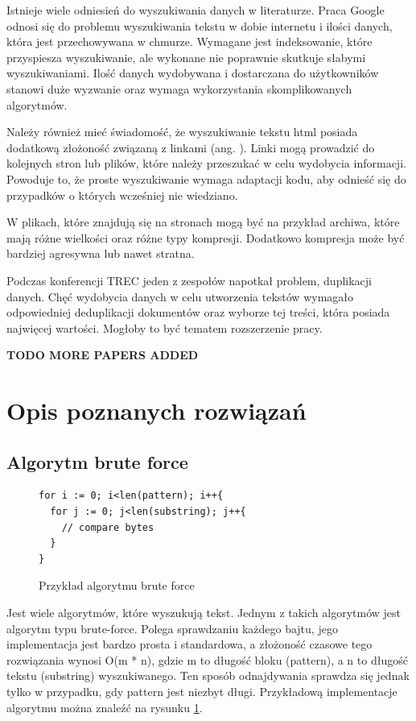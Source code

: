 Istnieje wiele odniesień do wyszukiwania danych w literaturze. Praca Google 
\cite{bib:internet:htmlSearchGoogle} odnosi się do problemu wyszukiwania tekstu 
w dobie internetu i ilości danych, która jest przechowywana w chmurze. Wymagane
jest indeksowanie, które przyspiesza wyszukiwanie, ale wykonane nie poprawnie 
skutkuje słabymi wyszukiwaniami. Ilość danych wydobywana i dostarczana do
użytkowników stanowi duże wyzwanie oraz wymaga wykorzystania skomplikowanych 
algorytmów. 

Należy również mieć świadomość, że wyszukiwanie tekstu html posiada dodatkową 
złożoność związaną z linkami (ang. ). Linki mogą prowadzić do 
kolejnych stron lub plików, które należy przeszukać w celu wydobycia informacji.
Powoduje to, że proste wyszukiwanie wymaga adaptacji kodu, aby odnieść się do 
przypadków o których wcześniej nie wiedziano.

W plikach, które znajdują się na stronach mogą być na przykład archiwa, które
mają różne wielkości oraz różne typy kompresji. Dodatkowo kompresja może być 
bardziej agresywna lub nawet stratna.

Podczas konferencji TREC \cite{bib:konferencja:TRECDuplicates} jeden z zespołów 
napotkał problem, duplikacji danych. Chęć wydobycia danych w celu utworzenia
tekstów wymagało odpowiedniej deduplikacji dokumentów oraz wyborze tej treści,
która posiada najwięcej wartości. Mogłoby to być tematem rozszerzenie pracy. 

\textbf{TODO MORE PAPERS ADDED}

\section{Opis poznanych rozwiązań}
\subsection{Algorytm brute force}

\begin{figure}[h]
  \centering
  \begin{lstlisting}
for i := 0; i<len(pattern); i++{
  for j := 0; j<len(substring); j++{
    // compare bytes
  }
}
  \end{lstlisting}
  \caption{Przykład algorytmu brute force}
  \label{fig:code:bruteForceComparison}
\end{figure}

Jest wiele algorytmów, które wyszukują tekst. Jednym z takich algorytmów jest 
algorytm typu brute-force. Polega sprawdzaniu każdego bajtu, jego implementacja
jest bardzo prosta i standardowa, a złożoność czasowe tego rozwiązania wynosi
O(m * n), gdzie m to długość bloku (pattern), a n to długość tekstu (substring) 
wyszukiwanego. Ten sposób odnajdywania sprawdza się jednak tylko w przypadku,
gdy pattern jest niezbyt długi. Przykładową implementacje algorytmu można 
znaleźć na rysunku \ref{fig:code:bruteForceComparison}.


